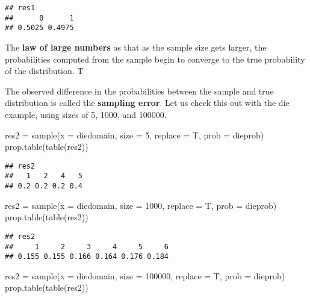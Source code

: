 \documentclass[
]{article}
\newenvironment{Shaded}{\begin{snugshade}}{\end{snugshade}}
\newcommand{\AttributeTok}[1]{\textcolor[rgb]{0.77,0.63,0.00}{#1}}
\newcommand{\DecValTok}[1]{\textcolor[rgb]{0.00,0.00,0.81}{#1}}
\newcommand{\FunctionTok}[1]{\textcolor[rgb]{0.00,0.00,0.00}{#1}}
\newcommand{\NormalTok}[1]{#1}
\newcommand{\OtherTok}[1]{\textcolor[rgb]{0.56,0.35,0.01}{#1}}
\begin{document}
\begin{verbatim}
## res1
##      0      1 
## 0.5025 0.4975
\end{verbatim}

The \textbf{law of large numbers} as that as the sample size gets
larger, the probabilities computed from the sample begin to converge to
the true probability of the distribution. T

The observed difference in the probabilities between the sample and true
distribution is called the \textbf{sampling error}. Let us check this
out with the die example, using sizes of 5, 1000, and 100000.

\begin{Shaded}
\begin{Highlighting}[]
\NormalTok{res2 }\OtherTok{=} \FunctionTok{sample}\NormalTok{(}\AttributeTok{x =}\NormalTok{ diedomain, }\AttributeTok{size =} \DecValTok{5}\NormalTok{, }\AttributeTok{replace =}\NormalTok{ T, }\AttributeTok{prob =}\NormalTok{ dieprob)}
\FunctionTok{prop.table}\NormalTok{(}\FunctionTok{table}\NormalTok{(res2))}
\end{Highlighting}
\end{Shaded}

\begin{verbatim}
## res2
##   1   2   4   5 
## 0.2 0.2 0.2 0.4
\end{verbatim}

\begin{Shaded}
\begin{Highlighting}[]
\NormalTok{res2 }\OtherTok{=} \FunctionTok{sample}\NormalTok{(}\AttributeTok{x =}\NormalTok{ diedomain, }\AttributeTok{size =} \DecValTok{1000}\NormalTok{, }\AttributeTok{replace =}\NormalTok{ T, }\AttributeTok{prob =}\NormalTok{ dieprob)}
\FunctionTok{prop.table}\NormalTok{(}\FunctionTok{table}\NormalTok{(res2))}
\end{Highlighting}
\end{Shaded}

\begin{verbatim}
## res2
##     1     2     3     4     5     6 
## 0.155 0.155 0.166 0.164 0.176 0.184
\end{verbatim}

\begin{Shaded}
\begin{Highlighting}[]
\NormalTok{res2 }\OtherTok{=} \FunctionTok{sample}\NormalTok{(}\AttributeTok{x =}\NormalTok{ diedomain, }\AttributeTok{size =} \DecValTok{100000}\NormalTok{, }\AttributeTok{replace =}\NormalTok{ T, }\AttributeTok{prob =}\NormalTok{ dieprob)}
\FunctionTok{prop.table}\NormalTok{(}\FunctionTok{table}\NormalTok{(res2))}
\end{Highlighting}
\end{Shaded}
\end{document}

